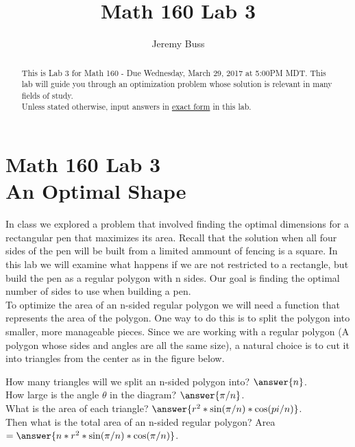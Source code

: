 \documentclass[handout,nooutcomes]{ximera}
\title{Math 160 Lab 3}
\author{Jeremy Buss} %
\begin{document}
\section{Math 160 Lab 3 \\ An Optimal Shape}

\begin{abstract}
This is Lab 3 for Math 160 - Due Wednesday, March 29, 2017 at 5:00PM MDT.
This lab will guide you through an optimization problem whose solution is relevant in many fields of study.\\

Unless stated otherwise, input answers in \underline{exact form} in this lab.
\end{abstract}

\maketitle

\hspace{2cm}In class we explored a problem that involved finding the optimal dimensions for a rectangular pen that maximizes its area. Recall that the solution when all four sides of the pen will be built from a limited ammount of fencing is a square. In this lab we will examine what happens if we are not restricted to a rectangle, but build the pen as a regular polygon with n sides. Our goal is finding the optimal number of sides to use when building a pen.\\
\medskip
\hspace{2cm}To optimize the area of an n-sided regular polygon we will need a function that represents the area of the polygon. One way to do this is to split the polygon into smaller, more manageable pieces. Since we are working with a regular polygon (A polygon whose sides and angles are all the same size), a natural choice is to cut it into triangles from the center as in the figure below.


\hspace{2cm}How many triangles will we split an n-sided polygon into? $\answer{n}$.\\
How large is the angle $\theta$ in the diagram? $\answer{\pi/n}$.\\
What is the area of each triangle? $\answer{r^2*\sin(\pi/n)*\cos(pi/n)}$.\\
Then what is the total area of an n-sided regular polygon? Area $=\answer{n*r^2*\sin(\pi/n)*\cos(\pi/n)}$.\\
\end{document}

